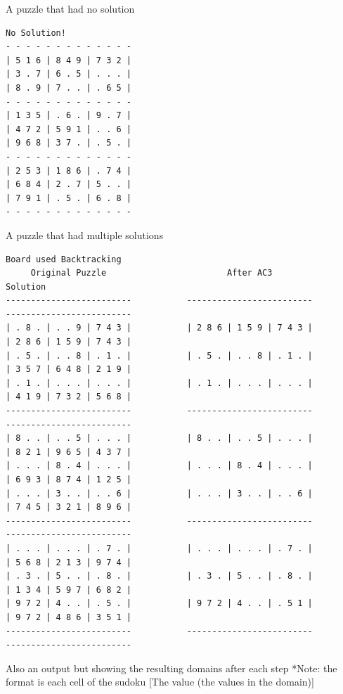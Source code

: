 \documentclass{article}
\begin{document}
A puzzle that had no solution
\begin{verbatim}
No Solution!
- - - - - - - - - - - - - 
| 5 1 6 | 8 4 9 | 7 3 2 |
| 3 . 7 | 6 . 5 | . . . |
| 8 . 9 | 7 . . | . 6 5 |
- - - - - - - - - - - - -
| 1 3 5 | . 6 . | 9 . 7 |
| 4 7 2 | 5 9 1 | . . 6 |
| 9 6 8 | 3 7 . | . 5 . | 
- - - - - - - - - - - - - 
| 2 5 3 | 1 8 6 | . 7 4 | 
| 6 8 4 | 2 . 7 | 5 . . |
| 7 9 1 | . 5 . | 6 . 8 |
- - - - - - - - - - - - -
\end{verbatim}
A puzzle that had multiple solutions
\begin{verbatim}
Board used Backtracking
     Original Puzzle                        After AC3                           Solution
-------------------------           -------------------------           -------------------------
| . 8 . | . . 9 | 7 4 3 |           | 2 8 6 | 1 5 9 | 7 4 3 |           | 2 8 6 | 1 5 9 | 7 4 3 |
| . 5 . | . . 8 | . 1 . |           | . 5 . | . . 8 | . 1 . |           | 3 5 7 | 6 4 8 | 2 1 9 |
| . 1 . | . . . | . . . |           | . 1 . | . . . | . . . |           | 4 1 9 | 7 3 2 | 5 6 8 |
-------------------------           -------------------------           -------------------------
| 8 . . | . . 5 | . . . |           | 8 . . | . . 5 | . . . |           | 8 2 1 | 9 6 5 | 4 3 7 |
| . . . | 8 . 4 | . . . |           | . . . | 8 . 4 | . . . |           | 6 9 3 | 8 7 4 | 1 2 5 | 
| . . . | 3 . . | . . 6 |           | . . . | 3 . . | . . 6 |           | 7 4 5 | 3 2 1 | 8 9 6 | 
-------------------------           -------------------------           -------------------------
| . . . | . . . | . 7 . |           | . . . | . . . | . 7 . |           | 5 6 8 | 2 1 3 | 9 7 4 |
| . 3 . | 5 . . | . 8 . |           | . 3 . | 5 . . | . 8 . |           | 1 3 4 | 5 9 7 | 6 8 2 |
| 9 7 2 | 4 . . | . 5 . |           | 9 7 2 | 4 . . | . 5 1 |           | 9 7 2 | 4 8 6 | 3 5 1 |
-------------------------           -------------------------           -------------------------
\end{verbatim}
\newpage
Also an output but showing the resulting domains after each step
*Note: the format is each cell of the sudoku [The value (the values in the domain)]
\addtolength{\oddsidemargin}{-0.7in}
\end{document}
